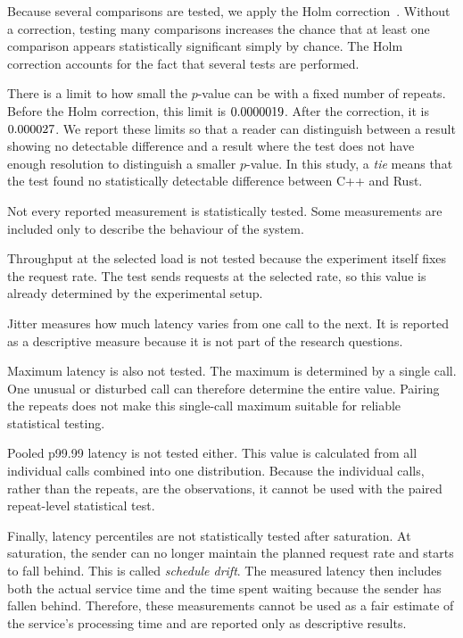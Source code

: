 \documentclass[english,oneside,a4paper,censored,csm,software-track-2020]{HYthesisML}
\begin{document}
Because several comparisons are tested, we apply the Holm
correction~\cite{holm1979simple}. Without a correction, testing many comparisons
increases the chance that at least one comparison appears statistically significant
simply by chance. The Holm correction accounts for the fact that several tests are
performed.

There is a limit to how small the $p$-value can be with a fixed number of repeats.
Before the Holm correction, this limit is $0.0000019$. After the correction,
it is $0.000027$. We report these limits so that a reader can distinguish
between a result showing no detectable difference and a result where the test does
not have enough resolution to distinguish a smaller $p$-value. In this study, a
\emph{tie} means that the test found no statistically detectable difference between
C++ and Rust.

Not every reported measurement is statistically tested. Some measurements are
included only to describe the behaviour of the system.

Throughput at the selected load is not tested because the experiment itself fixes
the request rate. The test sends requests at the selected rate, so this value is
already determined by the experimental setup.

Jitter measures how much latency varies from one call to the next. It is reported
as a descriptive measure because it is not part of the research questions.

Maximum latency is also not tested. The maximum is determined by a single call. One
unusual or disturbed call can therefore determine the entire value. Pairing the
repeats does not make this single-call maximum suitable for reliable statistical
testing.

Pooled p99.99 latency is not tested either. This value is calculated from all
individual calls combined into one distribution. Because the individual calls,
rather than the repeats, are the observations, it cannot be used with the paired
repeat-level statistical test.

Finally, latency percentiles are not statistically tested after saturation. At
saturation, the sender can no longer maintain the planned request rate and starts
to fall behind. This is called \emph{schedule drift}. The measured latency then
includes both the actual service time and the time spent waiting because the sender
has fallen behind. Therefore, these measurements cannot be used as a fair estimate
of the service's processing time and are reported only as descriptive results.
\end{document}
